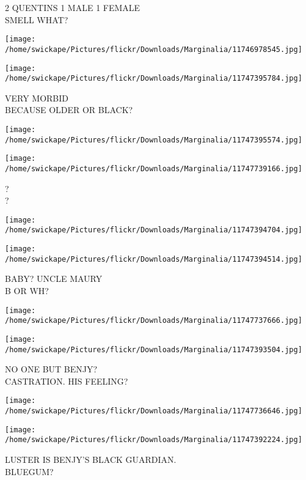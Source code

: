 \documentclass[10pt,letterpaper]{article}
\begin{document}
2 QUENTINS 1 MALE 1 FEMALE\\
SMELL WHAT?\\
\pagebreak

\texttt{[image: /home/swickape/Pictures/flickr/Downloads/Marginalia/11746978545.jpg]}

\vspace{0.25in}
\texttt{[image: /home/swickape/Pictures/flickr/Downloads/Marginalia/11747395784.jpg]}

VERY MORBID\\
BECAUSE OLDER OR BLACK?\\
\pagebreak

\texttt{[image: /home/swickape/Pictures/flickr/Downloads/Marginalia/11747395574.jpg]}

\vspace{0.25in}
\texttt{[image: /home/swickape/Pictures/flickr/Downloads/Marginalia/11747739166.jpg]}

?\\
?\\
\pagebreak

\texttt{[image: /home/swickape/Pictures/flickr/Downloads/Marginalia/11747394704.jpg]}

\vspace{0.25in}
\texttt{[image: /home/swickape/Pictures/flickr/Downloads/Marginalia/11747394514.jpg]}

BABY? UNCLE MAURY\\
B OR WH?\\
\pagebreak

\texttt{[image: /home/swickape/Pictures/flickr/Downloads/Marginalia/11747737666.jpg]}

\vspace{0.25in}
\texttt{[image: /home/swickape/Pictures/flickr/Downloads/Marginalia/11747393504.jpg]}

NO ONE BUT BENJY?\\
CASTRATION. HIS FEELING?\\
\pagebreak

\texttt{[image: /home/swickape/Pictures/flickr/Downloads/Marginalia/11747736646.jpg]}

\vspace{0.25in}
\texttt{[image: /home/swickape/Pictures/flickr/Downloads/Marginalia/11747392224.jpg]}

LUSTER IS BENJY'S BLACK GUARDIAN.\\
BLUEGUM?\\
\pagebreak
\end{document}

